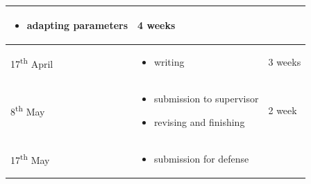 \documentclass[
	11pt, %
]{fphw}
\begin{document}
\begin{longtable}{ | m{4cm} | m{7cm} | m{3cm} | }
\begin{itemize}
		                                 \item adapting parameters
	                                 \end{itemize}                               & 4 weeks                        \\
	\hline
	17\textsuperscript{th} April   & \begin{itemize}
		                                 \item writing
	                                 \end{itemize}                                          & 3 weeks             \\
	\hline
	8\textsuperscript{th} May      & \begin{itemize}
		                                 \item submission to supervisor
		                                 \item revising and finishing
	                                 \end{itemize}                           & 2 week                             \\
	\hline
	17\textsuperscript{th} May     & \begin{itemize}
		                                 \item submission for defense
	                                 \end{itemize}                             &                                  \\
	\hline
\end{longtable}



\end{document}
